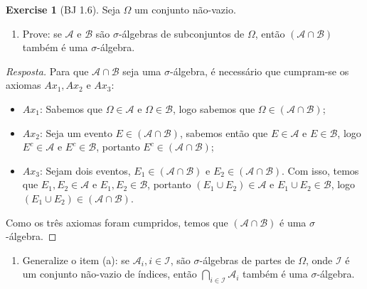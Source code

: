 \documentclass[
]{article}
\providecommand{\tightlist}{%
  \setlength{\itemsep}{0pt}\setlength{\parskip}{0pt}}
\theoremstyle{definition}
\theoremstyle{definition}
\theoremstyle{definition}
\newtheorem{exercise}{Exercise}[section]
\theoremstyle{definition}
\theoremstyle{remark}
\begin{document}
\begin{exercise}[BJ 1.6]

Seja \(\Omega\) um conjunto não-vazio.

\begin{enumerate}
\def\labelenumi{\alph{enumi})}
\tightlist
\item
  Prove: se \(\mathcal{A}\) e \(\mathcal{B}\) são \(\sigma\)-álgebras de subconjuntos de \(\Omega\), então \((\mathcal{A} \cap \mathcal{B})\) também é uma \(\sigma\)-álgebra.
\end{enumerate}

\begin{proof}[Resposta]
Para que \(\mathcal{A} \cap \mathcal{B}\) seja uma \(\sigma\)-álgebra, é necessário que cumpram-se os axiomas \(Ax_{1}, Ax_{2}\) e \(Ax_{3}\):

\begin{itemize}
\tightlist
\item
  \(Ax_{1}\): Sabemos que \(\Omega \in \mathcal{A}\) e \(\Omega \in \mathcal{B}\), logo sabemos que \(\Omega \in (\mathcal{A} \cap \mathcal{B})\);
\item
  \(Ax_{2}\): Seja um evento \(E \in (\mathcal{A} \cap \mathcal{B})\), sabemos então que \(E \in \mathcal{A}\) e \(E \in \mathcal{B}\), logo \(E^{c} \in \mathcal{A}\) e \(E^{c} \in \mathcal{B}\), portanto \(E^{c} \in (\mathcal{A} \cap \mathcal{B})\);
\item
  \(Ax_{3}\): Sejam dois eventos, \(E_{1} \in (\mathcal{A} \cap \mathcal{B})\) e \(E_{2} \in (\mathcal{A} \cap \mathcal{B})\). Com isso, temos que \(E_{1}, E_{2} \in \mathcal{A}\) e \(E_{1}, E_{2} \in \mathcal{B}\), portanto \((E_{1} \cup E_{2}) \in \mathcal{A}\) e \(E_{1} \cup E_{2} \in \mathcal{B}\), logo \((E_{1} \cup E_{2}) \in (\mathcal{A} \cap \mathcal{B})\).
\end{itemize}

Como os três axiomas foram cumpridos, temos que \((\mathcal{A} \cap \mathcal{B})\) é uma \(\sigma\)-álgebra.
\end{proof}

\begin{enumerate}
\def\labelenumi{\alph{enumi})}
\setcounter{enumi}{1}
\tightlist
\item
  Generalize o item (a): se \(\mathcal{A}_{i}, i \in \mathcal{I}\), são \(\sigma\)-álgebras de partes de \(\Omega\), onde \(\mathcal{I}\) é um conjunto não-vazio de índices, então \(\bigcap_{i \in \mathcal{I}}\mathcal{A}_{i}\) também é uma \(\sigma\)-álgebra.
\end{enumerate}


\end{exercise}
\end{document}
